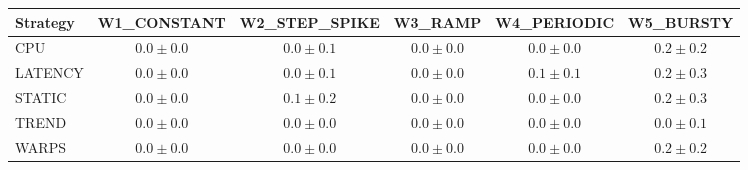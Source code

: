 \begin{tabular}{lccccc}
\toprule
Strategy & W1\_CONSTANT & W2\_STEP\_SPIKE & W3\_RAMP & W4\_PERIODIC & W5\_BURSTY \\
\midrule
CPU & $0.0 \pm 0.0$ & $0.0 \pm 0.1$ & $0.0 \pm 0.0$ & $0.0 \pm 0.0$ & $0.2 \pm 0.2$ \\
LATENCY & $0.0 \pm 0.0$ & $0.0 \pm 0.1$ & $0.0 \pm 0.0$ & $0.1 \pm 0.1$ & $0.2 \pm 0.3$ \\
STATIC & $0.0 \pm 0.0$ & $0.1 \pm 0.2$ & $0.0 \pm 0.0$ & $0.0 \pm 0.0$ & $0.2 \pm 0.3$ \\
TREND & $0.0 \pm 0.0$ & $0.0 \pm 0.0$ & $0.0 \pm 0.0$ & $0.0 \pm 0.0$ & $0.0 \pm 0.1$ \\
WARPS & $0.0 \pm 0.0$ & $0.0 \pm 0.0$ & $0.0 \pm 0.0$ & $0.0 \pm 0.0$ & $0.2 \pm 0.2$ \\
\bottomrule
\end{tabular}